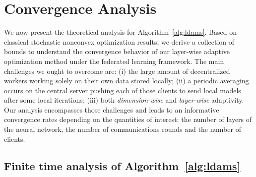 \documentclass[nohyperref]{article}
\theoremstyle{plain}
\theoremstyle{definition}
\theoremstyle{remark}
\begin{document}
\vspace{-0.1in}
\section{Convergence Analysis}\label{sec:theory}

We now present the theoretical analysis for Algorithm~\ref{alg:ldams}.  
Based on classical stochastic nonconvex optimization results, we derive a collection of bounds to understand the convergence behavior of our layer-wise adaptive optimization method under the federated learning framework.
The main challenges we ought to overcome are:
(i) the large amount of decentralized workers working solely on their own data stored locally; 
(ii) a periodic averaging occurs on the central server pushing each of those clients to send local models after some local iterations; 
(iii) both \emph{dimension-wise} and \emph{layer-wise} adaptivity.
Our analysis encompasses those challenges and leads to an informative convergence rates depending on the quantities of interest: the number of layers of the neural network, the number of communications rounds and the number of clients.


\subsection{Finite time analysis of Algorithm~\ref{alg:ldams}}
\end{document}
